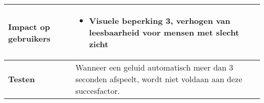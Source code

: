 \begin{table}[H]
\begin{tabular}{|l|p{12cm}|}
        \hline
        \textbf{Impact op gebruikers}         &  
        \begin{itemize}
            \item Visuele beperking 3, verhogen van leesbaarheid voor mensen met slecht zicht
        \end{itemize}                                                                                                                                                                                                                                                                                                                                                                                                                    \\ 
        \hline
        \textbf{Testen}                       & Wanneer een geluid automatisch meer dan 3 seconden afspeelt, wordt niet voldaan aan deze succesfactor.                                                                                                                                                                                                                                                              \\
        \hline
    \end{tabular}
\end{table}


